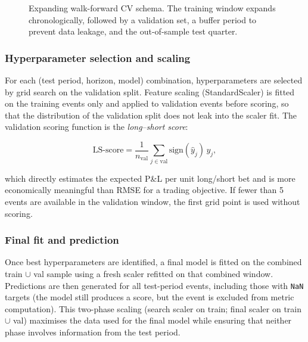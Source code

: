 \documentclass{article}
\begin{document}
\begin{figure}[H]
\caption{Expanding walk-forward CV schema. The training window expands chronologically, followed by a validation set, a buffer period to prevent data leakage, and the out-of-sample test quarter.}
\label{fig:wkfwd_schema}
\end{figure}
\FloatBarrier

\subsubsection{Hyperparameter selection and scaling}

For each (test period, horizon, model) combination, hyperparameters are selected by grid search on the validation split. Feature scaling (StandardScaler) is fitted on the training events only and applied to validation events before scoring, so that the distribution of the validation split does not leak into the scaler fit. The validation scoring function is the \textit{long--short score}:

\begin{equation}
\mathrm{LS}\text{-}\mathrm{score}
= \frac{1}{n_{\mathrm{val}}} \sum_{j \in \mathrm{val}}
  \mathrm{sign}(\hat{y}_j)\, y_j,
\label{eq:ls_score}
\end{equation}

which directly estimates the expected P\&L per unit long/short bet and is more economically meaningful than RMSE for a trading objective. If fewer than 5 events are available in the validation window, the first grid point is used without scoring.

\subsubsection{Final fit and prediction}

Once best hyperparameters are identified, a final model is fitted on the combined train $\cup$ val sample using a fresh scaler refitted on that combined window. Predictions are then generated for all test-period events, including those with \texttt{NaN} targets (the model still produces a score, but the event is excluded from metric computation). This two-phase scaling (search scaler on train; final scaler on train $\cup$ val) maximises the data used for the final model while ensuring that neither phase involves information from the test period.
\end{document}
